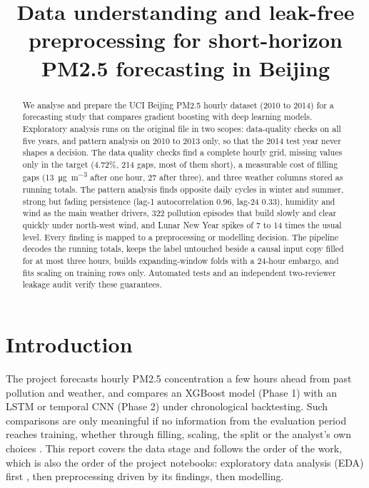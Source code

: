 \documentclass[conference]{IEEEtran}
\newcommand{\ugm}{\si{\micro\gram\per\cubic\metre}}
\begin{document}
\title{Data understanding and leak-free preprocessing for short-horizon PM2.5 forecasting in Beijing}

\author{
}

\maketitle

\begin{abstract}
We analyse and prepare the UCI Beijing PM2.5 hourly dataset (2010 to 2014) for a forecasting study that compares gradient boosting with deep learning models. Exploratory analysis runs on the original file in two scopes: data-quality checks on all five years, and pattern analysis on 2010 to 2013 only, so that the 2014 test year never shapes a decision. The data quality checks find a complete hourly grid, missing values only in the target (4.72\%, 214 gaps, most of them short), a measurable cost of filling gaps (13~\ugm{} after one hour, 27 after three), and three weather columns stored as running totals. The pattern analysis finds opposite daily cycles in winter and summer, strong but fading persistence (lag-1 autocorrelation 0.96, lag-24 0.33), humidity and wind as the main weather drivers, 322 pollution episodes that build slowly and clear quickly under north-west wind, and Lunar New Year spikes of 7 to 14 times the usual level. Every finding is mapped to a preprocessing or modelling decision. The pipeline decodes the running totals, keeps the label untouched beside a causal input copy filled for at most three hours, builds expanding-window folds with a 24-hour embargo, and fits scaling on training rows only. Automated tests and an independent two-reviewer leakage audit verify these guarantees.
\end{abstract}

\section{Introduction}
The project forecasts hourly PM2.5 concentration a few hours ahead from past pollution and weather, and compares an XGBoost model (Phase 1) with an LSTM or temporal CNN (Phase 2) under chronological backtesting. Such comparisons are only meaningful if no information from the evaluation period reaches training, whether through filling, scaling, the split or the analyst's own choices \cite{kaufman2012,tashman2000,bergmeir2012}. This report covers the data stage and follows the order of the work, which is also the order of the project notebooks: exploratory data analysis (EDA) first \cite{tukey1977}, then preprocessing driven by its findings, then modelling.
\end{document}
